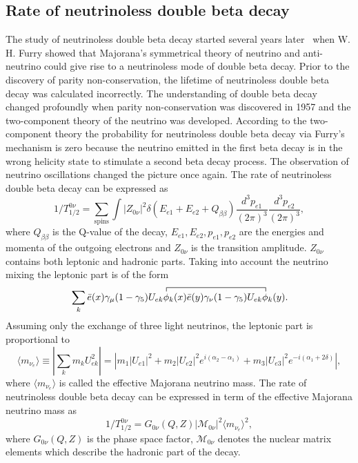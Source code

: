 \subsection{Rate of neutrinoless double beta decay}
\label{sec:0n2brate}
The study of neutrinoless double beta decay started several years later~\cite{Rac37,Fur37} when W. H. Furry showed that Majorana's symmetrical theory of neutrino and anti-neutrino could give rise to a neutrinoless mode of double beta decay. Prior to the discovery of parity non-conservation, the lifetime of neutrinoless double beta decay was calculated incorrectly. The understanding of double beta decay changed profoundly when parity non-conservation was discovered in 1957 and the two-component theory of the neutrino was developed. According to the two-component theory the probability for neutrinoless double beta decay via Furry's mechanism is zero because the neutrino emitted in the first beta decay is in the wrong helicity state to stimulate a second beta decay process. The observation of neutrino oscillations changed the picture once again. The rate of neutrinoless double beta decay can be expressed as
\begin{equation}
  \label{eq:0nura}
  1/T^{0\nu}_{1/2} = \sum_{\text{spins}} \int |Z_{0\nu}|^{2} \delta(E_{e1} + E_{e2} + Q_{\beta\beta}) \frac{d^{3}p_{e1}}{(2\pi)^{3}} \frac{d^{3}p_{e2}}{(2\pi)^{3}},
\end{equation}
where $Q_{\beta\beta}$ is the Q-value of the decay, $E_{e1}, E_{e2}, p_{e1}, p_{e2}$ are the energies and momenta of the outgoing electrons and $Z_{0\nu}$ is the transition amplitude. $Z_{0\nu}$ contains both leptonic and hadronic parts. Taking into account the neutrino mixing the leptonic part is of the form
\begin{equation}
  \label{eq:leppar}
  \contraction{\sum_{k}\bar{e}(x)\gamma_{\mu}(1-\gamma_{5})U_{ek}}
  {\phi}{{}_{k}(x)\bar{e}(y)\gamma_{\nu}(1-\gamma_{5})U_{ek}}{\phi}
  \sum_{k}\bar{e}(x)\gamma_{\mu}(1-\gamma_{5})U_{ek}\phi_{k}(x)
  \bar{e}(y)\gamma_{\nu}(1-\gamma_{5})U_{ek}\phi_{k}(y).
\end{equation}
Assuming only the exchange of three light neutrinos, the leptonic part is proportional to 
\begin{equation}
  \label{eq:effmass}
  \langle m_{\nu_{e}} \rangle \equiv \left| \sum_{k}m_{k}U^{2}_{ek} \right| = \left| m_{1}|U_{e1}|^{2} + m_{2}|U_{e2}|^{2}e^{i(\alpha_{2}-\alpha_{1})} + m_{3}|U_{e3}|^{2}e^{-i(\alpha_{1}+2\delta)} \right|,
\end{equation}
where $\langle m_{\nu_{e}} \rangle$ is called the effective Majorana neutrino mass. The rate of neutrinoless double beta decay can be expressed in term of the effective Majorana neutrino mass as
\begin{equation}
  \label{eq:0nurate}
  1/T^{0\nu}_{1/2} = G_{0\nu}(Q,Z) |\mathcal{M}_{0\nu}|^{2} \langle m_{\nu_{e}} \rangle^{2},
\end{equation}
where $G_{0\nu}(Q,Z)$ is the phase space factor, $\mathcal{M}_{0\nu}$ denotes the nuclear matrix elements which describe the hadronic part of the decay. 

